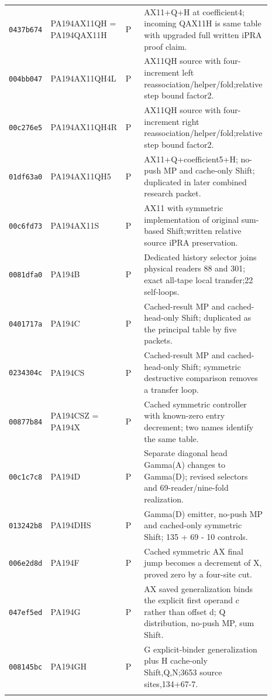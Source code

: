 \begin{longtable}{p{0.12\linewidth}p{0.25\linewidth}p{0.07\linewidth}p{0.45\linewidth}}
\texttt{0437b674} & PA194AX11QH = PA194QAX11H & P & AX11+Q+H at coefficient4; incoming QAX11H is same table with upgraded full written iPRA proof claim. \\ \addlinespace[2pt]
\texttt{004bb047} & PA194AX11QH4L & P & AX11QH source with four-increment left reassociation/helper/fold;relative step bound factor2. \\ \addlinespace[2pt]
\texttt{00c276e5} & PA194AX11QH4R & P & AX11QH source with four-increment right reassociation/helper/fold;relative step bound factor2. \\ \addlinespace[2pt]
\texttt{01df63a0} & PA194AX11QH5 & P & AX11+Q+coefficient5+H; no-push MP and cache-only Shift; duplicated in later combined research packet. \\ \addlinespace[2pt]
\texttt{00c6fd73} & PA194AX11S & P & AX11 with symmetric implementation of original sum-based Shift;written relative source iPRA preservation. \\ \addlinespace[2pt]
\texttt{0081dfa0} & PA194B & P & Dedicated history selector joins physical readers 88 and 301; exact all-tape local transfer;22 self-loops. \\ \addlinespace[2pt]
\texttt{0401717a} & PA194C & P & Cached-result MP and cached-head-only Shift; duplicated as the principal table by five packets. \\ \addlinespace[2pt]
\texttt{0234304c} & PA194CS & P & Cached-result MP and cached-head-only Shift; symmetric destructive comparison removes a transfer loop. \\ \addlinespace[2pt]
\texttt{00877b84} & PA194CSZ = PA194X & P & Cached symmetric controller with known-zero entry decrement; two names identify the same table. \\ \addlinespace[2pt]
\texttt{00c1c7c8} & PA194D & P & Separate diagonal head Gamma(A) changes to Gamma(D); revised selectors and 69-reader/nine-fold realization. \\ \addlinespace[2pt]
\texttt{013242b8} & PA194DHS & P & Gamma(D) emitter, no-push MP and cached-only symmetric Shift; 135 + 69 - 10 controls. \\ \addlinespace[2pt]
\texttt{006e2d8d} & PA194F & P & Cached symmetric AX final jump becomes a decrement of X, proved zero by a four-site cut. \\ \addlinespace[2pt]
\texttt{047ef5ed} & PA194G & P & AX saved generalization binds the explicit first operand c rather than offset d; Q distribution, no-push MP, sum Shift. \\ \addlinespace[2pt]
\texttt{008145bc} & PA194GH & P & G explicit-binder generalization plus H cache-only Shift,Q,N;3653 source sites,134+67-7. \\ \addlinespace[2pt]

\end{longtable}
